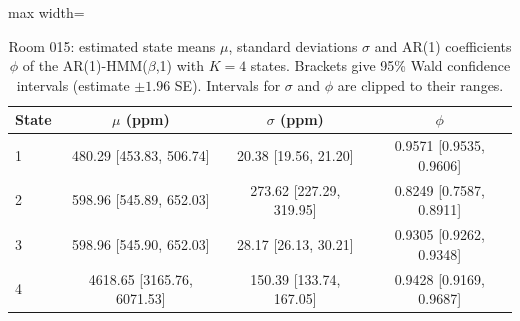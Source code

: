 \begin{table}[H]
\centering
\begin{adjustbox}{max width=\textwidth}
\begin{tabular}{lccc}
\hline
State & $\mu$ (ppm) & $\sigma$ (ppm) & $\phi$ \\
\hline
1 & 480.29 [453.83, 506.74] & 20.38 [19.56, 21.20] & 0.9571 [0.9535, 0.9606] \\
2 & 598.96 [545.89, 652.03] & 273.62 [227.29, 319.95] & 0.8249 [0.7587, 0.8911] \\
3 & 598.96 [545.90, 652.03] & 28.17 [26.13, 30.21] & 0.9305 [0.9262, 0.9348] \\
4 & 4618.65 [3165.76, 6071.53] & 150.39 [133.74, 167.05] & 0.9428 [0.9169, 0.9687] \\
\hline
\end{tabular}
\end{adjustbox}
\caption{Room 015: estimated state means $\mu$, standard deviations $\sigma$ and AR(1) coefficients $\phi$ of the AR(1)-HMM($\beta$,1) with $K=4$ states. Brackets give 95\% Wald confidence intervals (estimate $\pm 1.96$ SE). Intervals for $\sigma$ and $\phi$ are clipped to their ranges.}
\label{tab:params_emission_room_015_calibrated_anchor_ar1_hmm_beta_1_K4}
\end{table}
